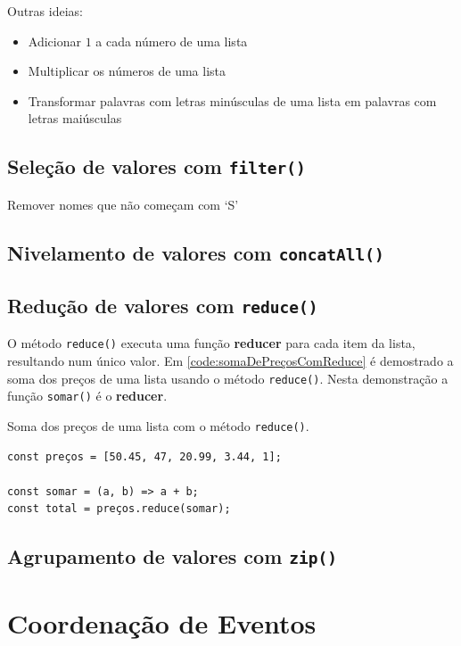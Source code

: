 Outras ideias:

\begin{itemize}
\item Adicionar \(1\) a cada número de uma lista
\item Multiplicar os números de uma lista
\item Transformar palavras com letras minúsculas de uma lista em palavras com
letras maiúsculas
\end{itemize}

\subsection{Seleção de valores com \texttt{filter()}}
\label{sec:orgdf5bd0e}
Remover nomes que não começam com ‘S’

\subsection{Nivelamento de valores com \texttt{concatAll()}}
\label{sec:org32929f0}
\subsection{Redução de valores com \texttt{reduce()}}
\label{sec:org5461138}

O método \texttt{reduce()} executa uma função \textbf{reducer} para cada item da
lista, resultando num único valor. Em \ref{code:somaDePreçosComReduce} é
demostrado a soma dos preços de uma lista usando o método \texttt{reduce()}.
Nesta demonstração a função \texttt{somar()} é o \textbf{reducer}.

\begin{listing}[htbp]
\caption{\label{code:somaDePreçosComReduce}Soma dos preços de uma lista com o método \texttt{reduce()}.}
\begin{verbatim}
const preços = [50.45, 47, 20.99, 3.44, 1];

const somar = (a, b) => a + b;
const total = preços.reduce(somar);
\end{verbatim}
\end{listing}

\subsection{Agrupamento de valores com \texttt{zip()}}
\label{sec:org4004e7d}

\section{Coordenação de Eventos}
\label{sec:org27de126}
